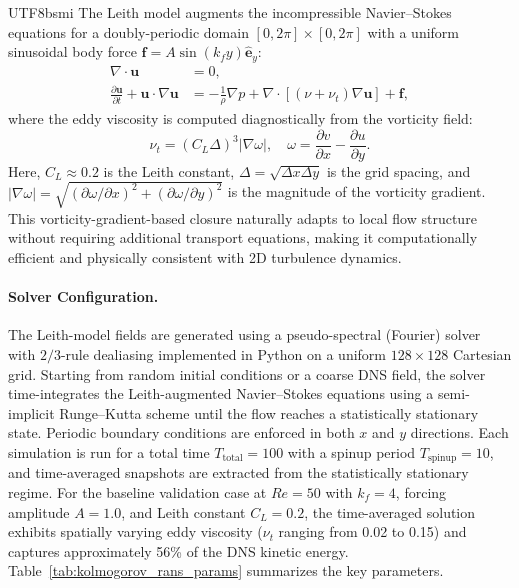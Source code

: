 \documentclass[master]{NTHUthesis}
\begin{document}
\begin{CJK*}{UTF8}{bsmi}
The Leith model augments the incompressible Navier--Stokes equations for a doubly-periodic domain $[0, 2\pi] \times [0, 2\pi]$ with a uniform sinusoidal body force $\mathbf{f} = A \sin(k_f y) \hat{\mathbf{e}}_y$:
\begin{align}
    \nabla \cdot \mathbf{u} &= 0, \\
    \frac{\partial \mathbf{u}}{\partial t} + \mathbf{u} \cdot \nabla \mathbf{u} &= -\frac{1}{\rho}\nabla p + \nabla \cdot \left[(\nu + \nu_t) \nabla \mathbf{u}\right] + \mathbf{f},
\end{align}
where the eddy viscosity is computed diagnostically from the vorticity field:
\begin{equation}
    \nu_t = (C_L \Delta)^3 |\nabla \omega|, \quad \omega = \frac{\partial v}{\partial x} - \frac{\partial u}{\partial y}.
\end{equation}
Here, $C_L \approx 0.2$ is the Leith constant, $\Delta = \sqrt{\Delta x \Delta y}$ is the grid spacing, and $|\nabla \omega| = \sqrt{(\partial \omega/\partial x)^2 + (\partial \omega/\partial y)^2}$ is the magnitude of the vorticity gradient. This vorticity-gradient-based closure naturally adapts to local flow structure without requiring additional transport equations, making it computationally efficient and physically consistent with 2D turbulence dynamics.

\paragraph{Solver Configuration.}
The Leith-model fields are generated using a pseudo-spectral (Fourier) solver with $2/3$-rule dealiasing implemented in Python on a uniform $128 \times 128$ Cartesian grid. Starting from random initial conditions or a coarse DNS field, the solver time-integrates the Leith-augmented Navier--Stokes equations using a semi-implicit Runge--Kutta scheme until the flow reaches a statistically stationary state. Periodic boundary conditions are enforced in both $x$ and $y$ directions. Each simulation is run for a total time $T_{\text{total}} = 100$ with a spinup period $T_{\text{spinup}} = 10$, and time-averaged snapshots are extracted from the statistically stationary regime. For the baseline validation case at $Re=50$ with $k_f=4$, forcing amplitude $A=1.0$, and Leith constant $C_L=0.2$, the time-averaged solution exhibits spatially varying eddy viscosity ($\nu_t$ ranging from 0.02 to 0.15) and captures approximately 56\% of the DNS kinetic energy. Table~\ref{tab:kolmogorov_rans_params} summarizes the key parameters.


\end{CJK*}
\end{document}
